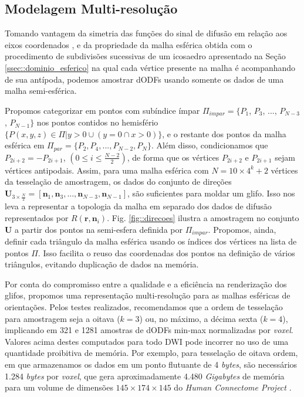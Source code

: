\subsection{Modelagem Multi-resolução}
\label{ssec:modelagem_multiresolucao}

Tomando vantagem da simetria das funções do sinal de difusão em relação aos eixos coordenados \cite{descoteaux2015}, e da propriedade da malha esférica obtida com o procedimento de subdivisões sucessivas de um icosaedro apresentado na Seção \ref{ssec::dominio_esferico} na qual cada vértice presente na malha é acompanhando de sua antípoda, podemos amostrar dODFs usando somente os dados de uma malha semi-esférica.

Propomos categorizar em pontos com subíndice ímpar $\Pi_{impar} = \{P_1$,
$P_3$, ...,
$P_{N-3}$,
$P_{N-1}\}$ nos pontos contidos no hemisfério $\{P(x, y, z) \in \Pi | y > 0 \cup (y = 0 \cap x > 0)\}$, e o restante dos pontos da malha esférica em $\Pi_{par} = \{P_2, P_4, ..., P_{N-2}, P_{N}\}$. Além disso, condicionamos que $P_{2i+2} = -P_{2i+1}$, $(0 \leq i \leq \frac{N-2}{2})$, de forma que os vértices $P_{2i+2}$ e $P_{2i+1}$ sejam vértices antipodais. Assim, para uma malha esférica com $N = 10 \times 4^k + 2$ vértices da tesselação de amostragem, os dados do conjunto de direções $\mathbf{U}_{3\times \frac{N}{2}} = [
\mathbf{n}_1,
\mathbf{n}_3, ..., 
\mathbf{n}_{N-3},
\mathbf{n}_{N-1}
]$, são suficientes para moldar um glifo. Isso nos leva a representar a topologia da malha em separado dos dados de difusão representados por $R(\mathbf{r},\mathbf{n}_i)$. Fig. \ref{fig::direcoes} ilustra a amostragem no conjunto $\mathbf{U}$ a partir dos pontos na semi-esfera definida por $\Pi_{impar}$. Propomos, ainda, definir cada triângulo da malha esférica usando os índices dos vértices na lista de pontos $\Pi$. Isso facilita o reuso das coordenadas dos pontos na definição de vários triângulos, evitando duplicação de dados na memória. 

Por conta do compromisso entre a qualidade e a eficiência na renderização dos glifos, propomos uma representação multi-resolução para as malhas esféricas de orientações. Pelos testes realizados, recomendamos que a ordem de tesselação para amostragem seja a oitava ($k=3$) ou, no máximo, a décima sexta ($k=4$), implicando em 321 e 1281 amostras de dODFs min-max normalizadas por \textit{voxel}. Valores acima destes computados para todo DWI pode incorrer no uso de uma quantidade proibitiva de memória. Por exemplo, para tesselação de oitava ordem, em que armazenamos os dados em um ponto flutuante de 4 \textit{bytes}, são necessários 1.284 \textit{bytes} por \textit{voxel}, que gera aproximadamente 4.480 \textit{Gigabytes} de memória para um volume de dimensões $145 \times 174 \times 145$ do \textit{Human Connectome Project} \cite{essen2012}.

